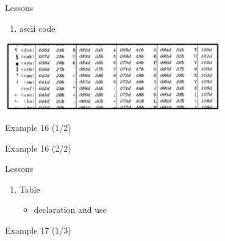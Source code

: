 \begin{frame}{Lessons}

\begin{enumerate}
\def\labelenumi{\arabic{enumi}.}
\tightlist
\item
  ascii code
\end{enumerate}

\begin{center}
\includegraphics[width=0.7\textwidth]{images/ascii.png}
\end{center}

\end{frame}

\begin{frame}{Example 16 (1/2)}



\end{frame}

\begin{frame}{Example 16 (2/2)}



\end{frame}

\begin{frame}{Lessons}

\begin{enumerate}
\def\labelenumi{\arabic{enumi}.}
\tightlist
\item
  Table

  \begin{itemize}
  \tightlist
  \item
    declaration and use
  \end{itemize}
\end{enumerate}

\end{frame}

\begin{frame}{Example 17 (1/3)}



\end{frame}

